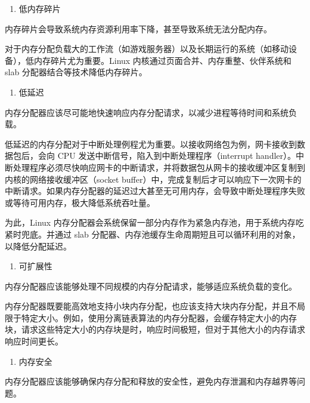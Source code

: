 \documentclass[AutoFakeBold]{LZUThesis}
\newcommand{\tightlist}{%
  \setlength{\itemsep}{0pt}\setlength{\parskip}{0pt}}
\begin{document}
\begin{sloppypar}
\begin{enumerate}
\def\labelenumi{\arabic{enumi}.}
\tightlist
\item
  低内存碎片
\end{enumerate}

内存碎片会导致系统内存资源利用率下降，甚至导致系统无法分配内存。

对于内存分配负载大的工作流（如游戏服务器）以及长期运行的系统（如移动设备），低内存碎片尤为重要。Linux
内核通过页面合并、内存重整、伙伴系统和 slab
分配器结合等技术降低内存碎片。

\begin{enumerate}
\def\labelenumi{\arabic{enumi}.}
\setcounter{enumi}{1}
\tightlist
\item
  低延迟
\end{enumerate}

内存分配器应该尽可能地快速响应内存分配请求，以减少进程等待时间和系统负载。

低延迟的内存分配对于中断处理例程尤为重要。以接收网络包为例，网卡接收到数据包后，会向
CPU 发送中断信号，陷入到中断处理程序（interrupt
handler）。中断处理程序必须尽快响应网卡的中断请求，并将数据包从网卡的接收缓冲区复制到内核的网络接收缓冲区（socket
buffer）中，完成复制后才可以响应下一次网卡的中断请求。如果内存分配器的延迟过大甚至无可用内存，会导致中断处理程序失败或等待可用内存，极大降低系统吞吐量。

为此，Linux
内存分配器会系统保留一部分内存作为紧急内存池，用于系统内存吃紧时兜底。并通过
slab 分配器、内存池缓存生命周期短且可以循环利用的对象，以降低分配延迟。

\begin{enumerate}
\def\labelenumi{\arabic{enumi}.}
\setcounter{enumi}{2}
\tightlist
\item
  可扩展性
\end{enumerate}

内存分配器应该能够处理不同规模的内存分配请求，能够适应系统负载的变化。

内存分配器既要能高效地支持小块内存分配，也应该支持大块内存分配，并且不局限于特定大小。例如，使用分离链表算法的内存分配器，会缓存特定大小的内存块，请求这些特定大小的内存块是时，响应时间极短，但对于其他大小的内存请求响应时间更长。

\begin{enumerate}
\def\labelenumi{\arabic{enumi}.}
\setcounter{enumi}{3}
\tightlist
\item
  内存安全
\end{enumerate}

内存分配器应该能够确保内存分配和释放的安全性，避免内存泄漏和内存越界等问题。


\end{sloppypar}
\end{document}
